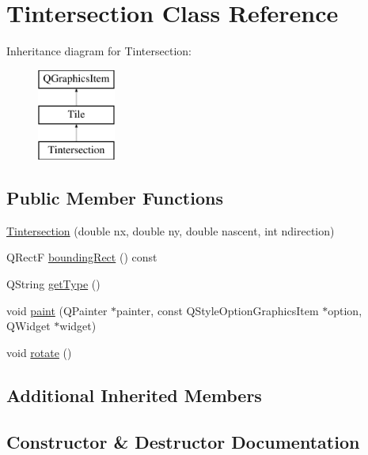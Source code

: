 \hypertarget{class_tintersection}{}\section{Tintersection Class Reference}
\label{class_tintersection}
Inheritance diagram for Tintersection\+:\begin{figure}[H]
\begin{center}
\leavevmode
\includegraphics[height=3.000000cm]{class_tintersection}
\end{center}
\end{figure}
\subsection*{Public Member Functions}
\begin{DoxyCompactItemize}
\item 
\mbox{\hyperlink{class_tintersection_a6824eaa4942a78f9e0d5c3306ea870fa}{Tintersection}} (double nx, double ny, double nascent, int ndirection)
\item 
Q\+RectF \mbox{\hyperlink{class_tintersection_a5de6b3193359f459a05430612a409b65}{bounding\+Rect}} () const
\item 
Q\+String \mbox{\hyperlink{class_tintersection_a363e657adcc349bd47ea4517feaec8df}{get\+Type}} ()
\item 
void \mbox{\hyperlink{class_tintersection_a848fe29e044ad8a42d37be377b81f08c}{paint}} (Q\+Painter $\ast$painter, const Q\+Style\+Option\+Graphics\+Item $\ast$option, Q\+Widget $\ast$widget)
\item 
void \mbox{\hyperlink{class_tintersection_abac11aa16f7515f1ca0ef32389255d15}{rotate}} ()
\end{DoxyCompactItemize}
\subsection*{Additional Inherited Members}


\subsection{Constructor \& Destructor Documentation}
\mbox{\label{class_tintersection_a6824eaa4942a78f9e0d5c3306ea870fa}} 
